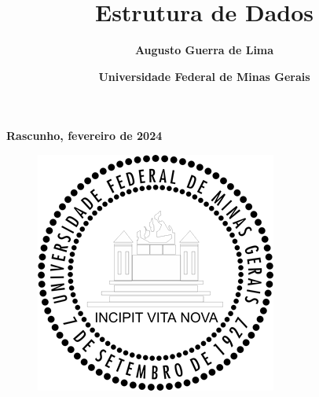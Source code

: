 \documentclass{article}
\title{\Huge\textbf{Estrutura de Dados}}
\author{\textbf{Augusto Guerra de Lima}}
\date{\textbf{Universidade Federal de Minas Gerais}}
\begin{document}
\maketitle
\textbf{Rascunho, fevereiro de 2024}
\begin{figure}
  \centering
  \includegraphics[width=0.2\linewidth]{img/UFMG.png}
\end{figure}

\newpage
\large

\tableofcontents

\newpage






\end{document}

